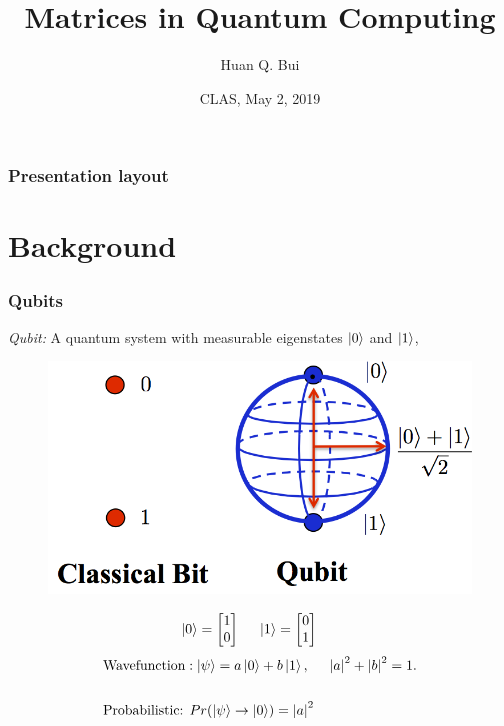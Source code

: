 \documentclass{beamer}
\title{Matrices in Quantum Computing}
\author[Huan Q. Bui] %
{Huan Q. Bui}
\institute[Colby College] %
{
	
	Matrix Analysis
	\and
	Professor Leo Livshits
}
\date{CLAS, May 2, 2019}
\theoremstyle{definition}
\begin{document}
 
\frame{\titlepage}
 
\begin{frame}
\frametitle{Presentation layout}
\tableofcontents
\end{frame}



\section{Background}



\begin{frame}
\frametitle{Qubits}
\textit{Qubit:} A quantum system with measurable eigenstates $\left\vert{0}\right\rangle$ and $\left\vert{1}\right\rangle$,
\begin{figure}[h!]
	\centering
	\includegraphics[scale=0.35]{atom1.png}
\end{figure}
\begin{align*}
\left\vert{0}\right\rangle = \begin{bmatrix}
1\\0
\end{bmatrix}\hspace{0.5cm} \left\vert{1}\right\rangle = \begin{bmatrix}
0\\1
\end{bmatrix} \hspace{0.5cm} 
\end{align*}
\begin{align*}
&\text{Wavefunction}: \left\vert{\psi}\right\rangle = a\left\vert{0}\right\rangle + b\left\vert{1}\right\rangle,\hspace{0.5cm} \abs{a}^2 + \abs{b}^2 = 1.\\
&\,\\
&\text{Probabilistic: } Pr(\left\vert{\psi}\right\rangle \to \left\vert{0}\right\rangle) = \abs{a}^2\hspace{0.5cm}
\end{align*}


\end{frame}
\end{document}
